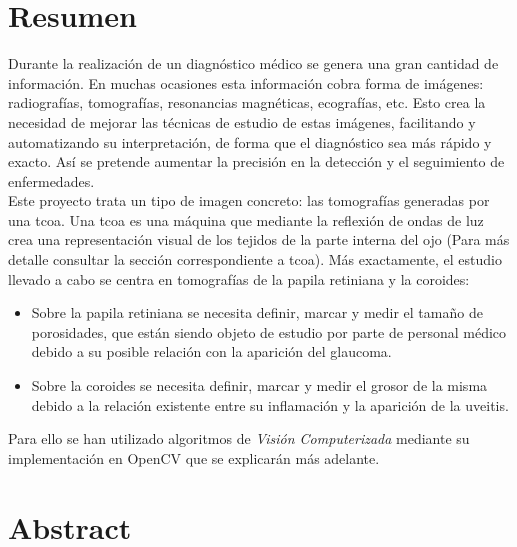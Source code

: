\section*{Resumen}
Durante la realización de un diagnóstico médico se genera una gran
cantidad de información. En muchas ocasiones esta información cobra
forma de imágenes: radiografías, tomografías, resonancias magnéticas, 
ecografías, etc. Esto crea la necesidad de mejorar las técnicas
de estudio de estas imágenes, facilitando y automatizando su interpretación,
de forma que el diagnóstico sea más rápido y exacto. Así se pretende
aumentar la precisión en la detección y el seguimiento de enfermedades.\\
Este proyecto trata un tipo de imagen concreto: las tomografías generadas 
por una \gls{tcoa}. Una \gls{tcoa} es una máquina que mediante la reflexión 
de ondas de luz crea una representación visual de los tejidos de la parte 
interna del ojo (Para más detalle consultar la sección correspondiente 
a \gls{tcoa}). Más exactamente, el estudio llevado a cabo se centra en
tomografías de la papila retiniana y la coroides:
\begin{itemize}
\item Sobre la papila retiniana se necesita definir, marcar y medir el tamaño
  de porosidades, que están siendo objeto de estudio por parte de personal
  médico debido a su posible relación con la aparición del glaucoma.
\item Sobre la coroides se necesita definir, marcar y medir el grosor de 
  la misma debido a la relación existente entre su inflamación y la
  aparición de la uveitis.
\end{itemize}
Para ello se han utilizado algoritmos de \emph{Visión Computerizada} 
mediante su implementación en OpenCV que se explicarán más adelante.
\section*{Abstract}

